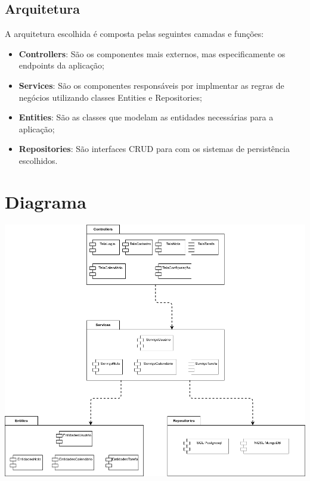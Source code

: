 \documentclass[
	12pt,				%
	openright,			%
	oneside,			    %
	a4paper,				%
	english,			%
	french,			%
	spanish,			%
	brazil			%
	]{abntex2}
\begin{document}
\subsection{Arquitetura}
A arquitetura escolhida é composta pelas seguintes camadas e funções:
\begin{itemize}
    \item \textbf{Controllers}: São os componentes mais externos, mas especificamente os endpoints da aplicação;
    \item \textbf{Services}: São os componentes responsáveis por implmentar as regras de negócios utilizando classes Entities e Repositories;
    \item \textbf{Entities}: São as classes que modelam as entidades necessárias para a aplicação;
    \item \textbf{Repositories}: São interfaces CRUD para com os sistemas de persistência escolhidos.
\end{itemize}

\section{Diagrama}
\includegraphics[scale=0.4]{Imagens/arquitetura.png}
\end{document}
